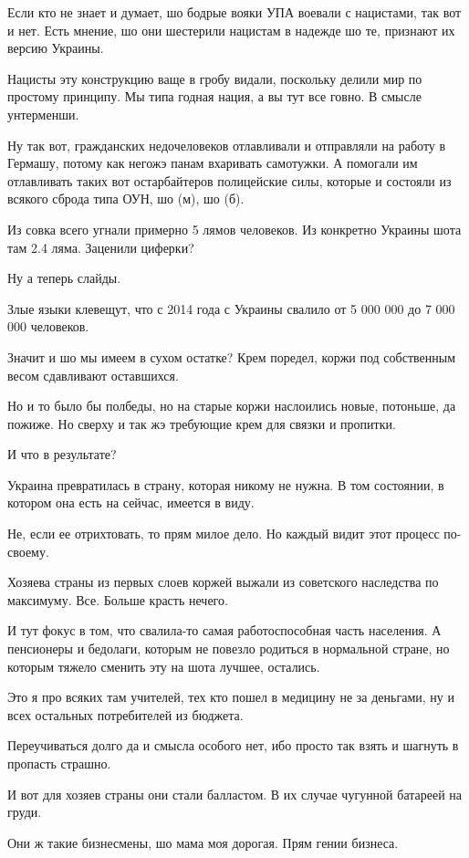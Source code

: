 \begin{multicols}{2}
Если кто не знает и думает, шо бодрые вояки УПА воевали с нацистами, так вот и
нет. Есть мнение, шо они шестерили нацистам в надежде шо те, признают их версию
Украины.

Нацисты эту конструкцию ваще в гробу видали, поскольку делили мир по простому
принципу. Мы типа годная нация, а вы тут все говно. В смысле унтерменши.

Ну так вот, гражданских недочеловеков отлавливали и отправляли на работу в
Гермашу, потому как негожэ панам вхаривать самотужки. А помогали им отлавливать
таких вот остарбайтеров полицейские силы, которые и состояли из всякого сброда
типа ОУН, шо (м), шо (б).

Из совка всего угнали примерно 5 лямов человеков. Из конкретно Украины шота там
2.4 ляма. Заценили циферки?

Ну а теперь слайды.

Злые языки клевещут, что с 2014 года с Украины свалило от 5 000 000 до 7 000
000 человеков.

Значит и шо мы имеем в сухом остатке? Крем поредел, коржи под собственным весом
сдавливают оставшихся.

Но и то было бы полбеды, но на старые коржи наслоились новые, потоньше, да
пожиже. Но сверху и так жэ требующие крем для связки и пропитки.

И что в результате?

Украина превратилась в страну, которая никому не нужна. В том состоянии, в
котором она есть на сейчас, имеется в виду.

Не, если ее отрихтовать, то прям милое дело. Но каждый видит этот процесс
по-своему.

Хозяева страны из первых слоев коржей выжали из советского наследства по
максимуму. Все. Больше красть нечего.

И тут фокус в том, что свалила-то самая работоспособная часть населения. А
пенсионеры и бедолаги, которым не повезло родиться в нормальной стране, но
которым тяжело сменить эту на шота лучшее, остались.

Это я про всяких там учителей, тех кто пошел в медицину не за деньгами, ну и
всех остальных потребителей из бюджета.

Переучиваться долго да и смысла особого нет, ибо просто так взять и шагнуть в
пропасть страшно.

И вот для хозяев страны они стали балластом. В их случае чугунной батареей на
груди.

Они ж такие бизнесмены, шо мама моя дорогая. Прям гении бизнеса.


\end{multicols}
